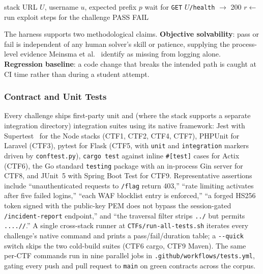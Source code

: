 \begin{algorithm}[t]
\caption{Generic exploit-as-a-test harness}
\label{alg:exploit-harness}
\small
\begin{algorithmic}[1]
\Require stack URL $U$, username $u$, expected prefix $p$
\State wait for \texttt{GET} $U$\texttt{/health} $\to$ 200
\State $r \gets$ run exploit steps for the challenge
  \State \Return PASS
\Else
  \State \Return FAIL
\EndIf
\end{algorithmic}
\end{algorithm}

The harness supports two methodological claims.
\textbf{Objective solvability}: pass or fail is independent
of any human solver's skill or patience, supplying the
process-level evidence Meinsma et al.~\cite{Meinsma2022}
identify as missing from logging alone.
\textbf{Regression baseline}: a code change that breaks the
intended path is caught at CI time rather than during a
student attempt.

\subsubsection{Contract and Unit Tests}

Every challenge ships first-party unit and (where the
stack supports a separate integration directory) integration
suites using its native framework: Jest with
Supertest~\cite{JestSupertest} for the Node stacks (CTF1,
CTF2, CTF4, CTF7), PHPUnit for Laravel (CTF3), pytest for
Flask (CTF5, with \texttt{unit} and \texttt{integration}
markers driven by \texttt{conftest.py}), \texttt{cargo test}
against inline \texttt{\#[test]} cases for Actix (CTF6),
the Go standard \texttt{testing} package with an in-process
Gin server for CTF8, and JUnit~5 with Spring Boot Test for
CTF9. Representative assertions include ``unauthenticated
requests to \texttt{/flag} return 403,'' ``rate limiting
activates after five failed logins,'' ``each WAF blocklist
entry is enforced,'' ``a forged HS256 token signed with the
public-key PEM does not bypass the session-gated
\texttt{/incident-report} endpoint,'' and ``the traversal
filter strips \texttt{../} but permits \texttt{....//}.''
A single cross-stack runner at \texttt{CTFs/run-all-tests.sh}
iterates every challenge's native command and prints a
pass/fail/duration table; a \texttt{-{-}quick} switch skips
the two cold-build suites (CTF6 cargo, CTF9 Maven). The
same per-CTF commands run in nine parallel jobs in
\texttt{.github/workflows/tests.yml}, gating every push and
pull request to \texttt{main} on green contracts across the
corpus.

